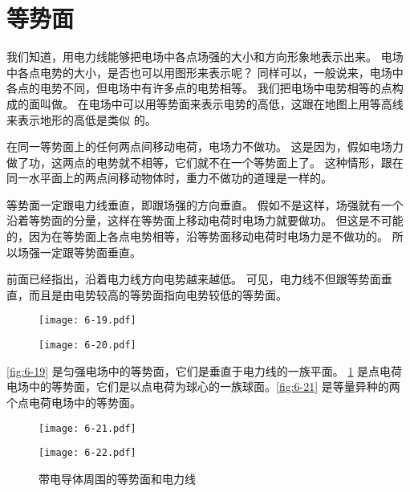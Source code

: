 \section{等势面}

我们知道，用电力线能够把电场中各点场强的大小和方向形象地表示出来。
电场中各点电势的大小，是否也可以用图形来表示呢？
同样可以，一般说来，电场中各点的电势不同，但电场中有许多点的电势相等。
我们把电场中电势相等的点构成的面叫做。
在电场中可以用等势面来表示电势的高低，这跟在地图上用等高线来表示地形的高低是类似
的。

在同一等势面上的任何两点间移动电荷，电场力不做功。
这是因为，假如电场力做了功，这两点的电势就不相等，它们就不在一个等势面上了。
这种情形，跟在同一水平面上的两点间移动物体时，重力不做功的道理是一样的。

等势面一定跟电力线垂直，即跟场强的方向垂直。
假如不是这样，场强就有一个沿着等势面的分量，这样在等势面上移动电荷时电场力就要做功。
但这是不可能的，因为在等势面上各点电势相等，沿等势面移动电荷时电场力是不做功的。
所以场强一定跟等势面垂直。

前面已经指出，沿着电力线方向电势越来越低。
可见，电力线不但跟等势面垂直，而且是由电势较高的等势面指向电势较低的等势面。

\begin{figure}
	\begin{minipage}[b]{0.48\linewidth}\centering
		\texttt{[image: 6-19.pdf]}
		\caption{}\label{fig:6-19}
	\end{minipage}
	\begin{minipage}[b]{0.48\linewidth}\centering
		\texttt{[image: 6-20.pdf]}
		\caption{}\label{fig:6-20}
	\end{minipage}
\end{figure}

\cref{fig:6-19} 是匀强电场中的等势面，它们是垂直于电力线的一族平面。
\cref{fig:6-20} 是点电荷电场中的等势面，它们是以点电荷为球心的一族球面。\cref{fig:6-21} 是等量异种的两个点电荷电场中的等势面。

\begin{figure}
	\begin{minipage}[b]{0.48\linewidth}\centering
		\texttt{[image: 6-21.pdf]}
		\caption{}\label{fig:6-21}
	\end{minipage}
	\begin{minipage}[b]{0.48\linewidth}\centering
		\texttt{[image: 6-22.pdf]}
		\caption{带电导体周围的等势面和电力线}\label{fig:6-22}
	\end{minipage}
\end{figure}


